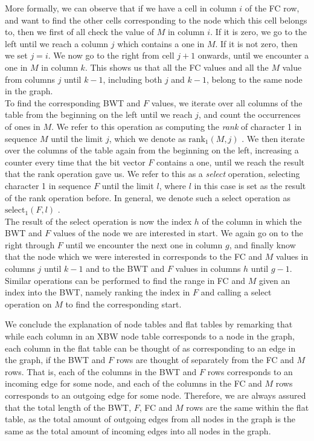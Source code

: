\documentclass[a4paper,12pt,twoside,BCOR=10mm]{scrbook}
\begin{document}
More formally, we can observe that 
if we have a cell in column $ i $ of the FC row, and want to find the other cells corresponding to 
the node which this cell belongs to, then we first of all check the value of $ M $ in column $ i $. 
If it is zero, we go to the left until we reach a column $ j $ which contains a one in $ M $. 
If it is not zero, then we set $ j = i $. 
We now go to the right from cell $ j + 1 $ onwards, until we encounter a one in $ M $ in column $ k $. 
This shows us that all the FC values and all the $ M $ value 
from columns $ j $ until $ k - 1 $, including both $ j $ and $ k - 1 $, 
belong to the same node in the graph. \\
To find the corresponding BWT and $ F $ values, we iterate over all columns of the table from the beginning on 
the left until we reach $ j $, and count the occurrences of ones in $ M $. 
We refer to this operation as computing the \textit{rank} of character 1 in sequence $ M $ until the limit $ j $, 
which we denote as $ \textrm{rank}_1 ( M, j ) $ \citep{Siren2009}.\label{def:rank} 
We then iterate over the columns of the table again from the beginning on the left, 
increasing a counter every time that the bit vector $ F $ contains a one, until we reach 
the result that the rank operation gave us. 
We refer to this as a \textit{select} operation, selecting character 1 in sequence $ F $ until the limit $ l $, 
where $ l $ in this case is set as the result of the rank operation before. In general, 
we denote such a select operation as $ \textrm{select}_1 ( F, l ) $ \citep{Siren2009}.\label{def:select} \\
The result of the select operation is now the index $ h $ of the column in which the BWT and $ F $ values 
of the node we are interested in start. 
We again go on to the right through $ F $ until we encounter the next one in column $ g $, 
and finally know that the node which we were interested in corresponds to the 
FC and $ M $ values in columns $ j $ until $ k - 1 $ and to the BWT and $ F $ values in columns $ h $ until $ g - 1 $. \\
Similar operations can be performed to find the range in FC and $ M $ given an index into the BWT, 
namely ranking the index in $ F $ and calling a select operation on $ M $ to find the corresponding start.

We conclude the explanation of node tables and flat tables by remarking that while each column 
in an XBW node table corresponds to a node in the graph, 
each column in the flat table can be thought of as corresponding to an edge in the graph, 
if the BWT and $ F $ rows are thought of separately from the FC and $ M $ rows. 
That is, each of the columns in the BWT and $ F $ rows corresponds to an incoming edge for some node, 
and each of the columns in the FC and $ M $ rows corresponds to an outgoing edge for some node. 
Therefore, we are always assured that the total length of the BWT, $ F $, FC and $ M $ rows are the same 
within the flat table, as the total amount of outgoing edges from all nodes in the graph is 
the same as the total amount of incoming edges into all nodes in the graph.
\end{document}
